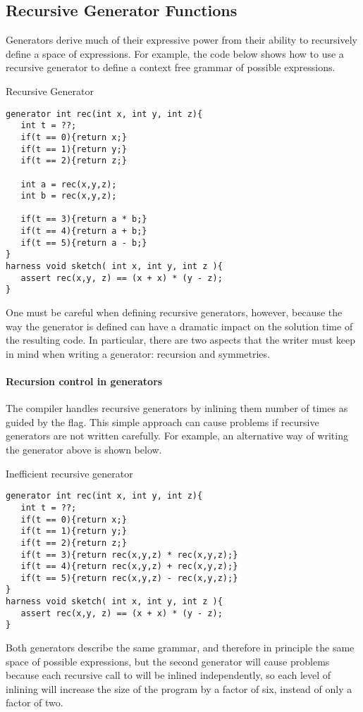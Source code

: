\subsection{Recursive Generator Functions}

Generators derive much of their expressive power from their ability to recursively define a space of expressions. For example, the code below shows how to use a recursive generator to define a context free grammar of possible expressions.

\begin{Example}{Recursive Generator}
\begin{lstlisting}
generator int rec(int x, int y, int z){
   int t = ??;
   if(t == 0){return x;}   
   if(t == 1){return y;}
   if(t == 2){return z;}

   int a = rec(x,y,z);
   int b = rec(x,y,z);

   if(t == 3){return a * b;}
   if(t == 4){return a + b;} 
   if(t == 5){return a - b;}   
}
harness void sketch( int x, int y, int z ){
   assert rec(x,y, z) == (x + x) * (y - z);
}
\end{lstlisting}
\end{Example}

One must be careful when defining recursive generators, however, because the way the generator is defined can have a dramatic impact on the solution time of the resulting code. In particular, there are two aspects that the writer must keep in mind when writing a generator: recursion and symmetries. 


\paragraph{Recursion control in generators}
The compiler handles recursive generators by inlining them number of times as guided by the  flag. This simple approach can cause problems if recursive generators are not written carefully. For example, an alternative way of writing the generator above is shown below.  

\begin{Example}{Inefficient recursive generator}
\begin{lstlisting}
generator int rec(int x, int y, int z){
   int t = ??;
   if(t == 0){return x;}   
   if(t == 1){return y;}
   if(t == 2){return z;}
   if(t == 3){return rec(x,y,z) * rec(x,y,z);}
   if(t == 4){return rec(x,y,z) + rec(x,y,z);} 
   if(t == 5){return rec(x,y,z) - rec(x,y,z);}   
}
harness void sketch( int x, int y, int z ){
   assert rec(x,y, z) == (x + x) * (y - z);
}
\end{lstlisting}
\end{Example}
Both generators describe the same grammar, and therefore in principle the same space of possible expressions, but the second generator will cause problems because each recursive call to  will be inlined independently, so each level of inlining will increase the size of the program by a factor of six, instead of only a factor of two. 

